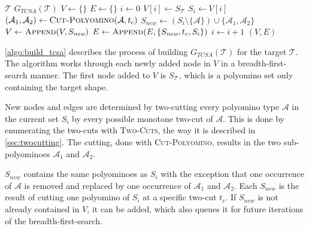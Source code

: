 \begin{algorithm}
	\caption{$\text{\scshape Build-TCSA-Graph}$}
	\label{algo:build_tcsa}
	\begin{algorithmic}[1]
		\REQUIRE $\mathcal{T}$ 
		\ENSURE $G_{\textit{TCSA}}(\mathcal{T})$  
		\STATE $V \gets \{\}$
		\STATE $E \gets \{\}$
		\STATE $i \gets 0$
		\STATE $V[i] \gets S_\mathcal{T}$ 
			\STATE $S_i \gets V[i]$
					\STATE $(\mathcal{A}_1, \mathcal{A}_2) \gets \text{\scshape Cut-Polyomino}(\mathcal{A}, t_c)$
					\STATE $S_\textit{new} \gets \left( S_i \setminus \{\mathcal{A}\} \right) \cup \{\mathcal{A}_1, \mathcal{A}_2\}$ 
						\STATE $V \gets \text{\scshape Append}(V, S_\textit{new})$
					\ENDIF
					\STATE $E \gets \text{\scshape Append}(E, \{S_\textit{new}, t_c, S_i\})$
				\ENDFOR
			\ENDFOR
			\STATE $i \gets i+1$
		\ENDWHILE
		\RETURN $(V,E)$
	\end{algorithmic}
\end{algorithm}

\autoref{algo:build_tcsa} describes the process of building $G_{\textit{TCSA}}(\mathcal{T})$ for the target $\mathcal{T}$.
The algorithm works through each newly added node in $V$ in a breadth-first-search manner.
The first node added to $V$ is $S_\mathcal{T}$, which is a polyomino set only containing the target shape.

New nodes and edges are determined by two-cutting every polyomino type $\mathcal{A}$ in the current set $S_i$ by every possible monotone two-cut of $\mathcal{A}$.
This is done by enumerating the two-cuts with {\scshape Two-Cuts}, the way it is described in \autoref{sec:twocutting}.
The cutting, done with {\scshape Cut-Polyomino}, results in the two sub-polyominoes $\mathcal{A}_1$ and $\mathcal{A}_2$.

$S_\textit{new}$ contains the same polyominoes as $S_i$ with the exception that one occurrence of $\mathcal{A}$ is removed and replaced by one occurrence of $\mathcal{A}_1$ and $\mathcal{A}_2$.
Each $S_\textit{new}$ is the result of cutting one polyomino of $S_i$ at a specific two-cut $t_c$.
If $S_\textit{new}$ is not already contained in $V$, it can be added, which also queues it for future iterations of the breadth-first-search.


